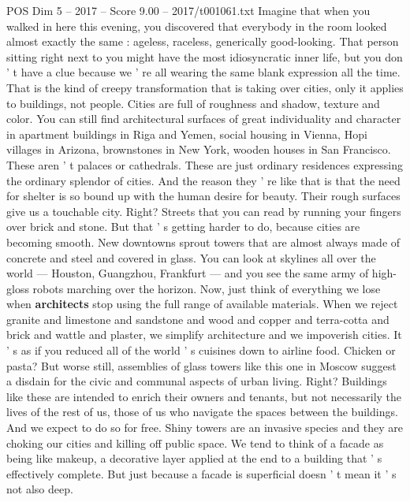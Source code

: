 \begin{textsample}{POS Dim 5 – 2017 – Score 9.00 – 2017/t001061.txt}  \label{ex:f5_pos_058}
Imagine that when you walked in here this evening, you discovered that everybody in the room looked almost exactly the same : ageless, raceless, generically good-looking.
That person sitting right next to you might have the most idiosyncratic inner life, but you don ' t have a clue because we ' re all wearing the same blank expression all the time.
That is the kind of creepy transformation that is taking over cities, only it applies to buildings, not people.
Cities are full of roughness and shadow, texture and color.
You can still find architectural surfaces of great individuality and character in apartment buildings in Riga and Yemen, social housing in Vienna, Hopi villages in Arizona, brownstones in New York, wooden houses in San Francisco.
These aren ' t palaces or cathedrals.
These are just ordinary residences expressing the ordinary splendor of cities.
And the reason they ' re like that is that the need for shelter is so bound up with the human desire for beauty.
Their rough surfaces give us a touchable city.
Right?
Streets that you can read by running your fingers over brick and stone.
But that ' s getting harder to do, because cities are becoming smooth.
New downtowns sprout towers that are almost always made of concrete and steel and covered in glass.
You can look at skylines all over the world — Houston, Guangzhou, Frankfurt — and you see the same army of high-gloss robots marching over the horizon.
Now, just think of everything we lose when \textbf{architects} stop using the full range of available materials.
When we reject granite and limestone and sandstone and wood and copper and terra-cotta and brick and wattle and plaster, we simplify architecture and we impoverish cities.
It ' s as if you reduced all of the world ' s cuisines down to airline food.
Chicken or pasta?
But worse still, assemblies of glass towers like this one in Moscow suggest a disdain for the civic and communal aspects of urban living.
Right?
Buildings like these are intended to enrich their owners and tenants, but not necessarily the lives of the rest of us, those of us who navigate the spaces between the buildings.
And we expect to do so for free.
Shiny towers are an invasive species and they are choking our cities and killing off public space.
We tend to think of a facade as being like makeup, a decorative layer applied at the end to a building that ' s effectively complete.
But just because a facade is superficial doesn ' t mean it ' s not also deep.

\end{textsample}

